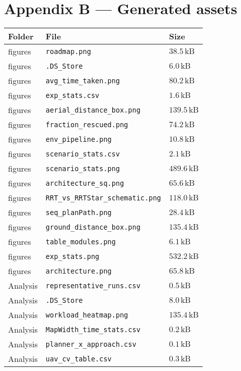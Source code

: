 \section*{Appendix B — Generated assets}

\begin{tabular}{@{}lll@{}}
\toprule
\textbf{Folder} & \textbf{File} & \textbf{Size} \\
\midrule
figures & \texttt{roadmap.png} & $38.5\,\text{kB}$ \\
figures & \texttt{.DS_Store} & $6.0\,\text{kB}$ \\
figures & \texttt{avg_time_taken.png} & $80.2\,\text{kB}$ \\
figures & \texttt{exp_stats.csv} & $1.6\,\text{kB}$ \\
figures & \texttt{aerial_distance_box.png} & $139.5\,\text{kB}$ \\
figures & \texttt{fraction_rescued.png} & $74.2\,\text{kB}$ \\
figures & \texttt{env_pipeline.png} & $10.8\,\text{kB}$ \\
figures & \texttt{scenario_stats.csv} & $2.1\,\text{kB}$ \\
figures & \texttt{scenario_stats.png} & $489.6\,\text{kB}$ \\
figures & \texttt{architecture_sq.png} & $65.6\,\text{kB}$ \\
figures & \texttt{RRT_vs_RRTStar_schematic.png} & $118.0\,\text{kB}$ \\
figures & \texttt{seq_planPath.png} & $28.4\,\text{kB}$ \\
figures & \texttt{ground_distance_box.png} & $135.4\,\text{kB}$ \\
figures & \texttt{table_modules.png} & $6.1\,\text{kB}$ \\
figures & \texttt{exp_stats.png} & $532.2\,\text{kB}$ \\
figures & \texttt{architecture.png} & $65.8\,\text{kB}$ \\
Analysis & \texttt{representative_runs.csv} & $0.5\,\text{kB}$ \\
Analysis & \texttt{.DS_Store} & $8.0\,\text{kB}$ \\
Analysis & \texttt{workload_heatmap.png} & $135.4\,\text{kB}$ \\
Analysis & \texttt{MapWidth_time_stats.csv} & $0.2\,\text{kB}$ \\
Analysis & \texttt{planner_x_approach.csv} & $0.1\,\text{kB}$ \\
Analysis & \texttt{uav_cv_table.csv} & $0.3\,\text{kB}$ \\

\end{tabular}

